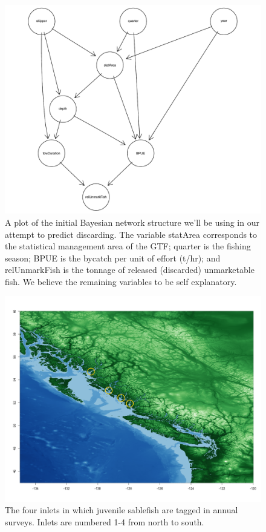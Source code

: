 \documentclass{article}
\begin{document}
\begin{figure}[!h]
\begin{center}
\includegraphics[scale = 0.8]{Images/BN.pdf}
\end{center}
\caption{A plot of the initial Bayesian network structure we'll be using in our attempt to predict discarding. The variable statArea corresponds to the statistical management area of the GTF; quarter is the fishing season; BPUE is the bycatch per unit of effort (t/hr); and relUnmarkFish is the tonnage of released (discarded) unmarketable fish. We believe the remaining variables to be self explanatory. } \label{fig:BN}
\end{figure}

\begin{figure}[!h]
\begin{center}
\includegraphics[scale = 0.4]{Images/inletsMap.png}
\end{center}
\caption{The four inlets in which juvenile sablefish are tagged in annual surveys. Inlets are numbered 1-4 from north to south.} \label{fig:inlets}
\end{figure}
\end{document}
